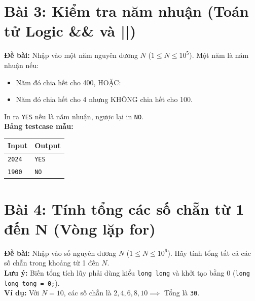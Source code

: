 \documentclass[11pt,a4paper]{article}
\begin{document}
\section*{\color{AsianDarkBlue}Bài 3: Kiểm tra năm nhuận (Toán tử Logic \&\& và ||)}
\textbf{Đề bài:} Nhập vào một năm nguyên dương $N$ ($1 \le N \le 10^5$). Một năm là năm nhuận nếu:
\begin{itemize}
    \setlength{\itemsep}{1pt}
    \item Năm đó chia hết cho 400, HOẶC:
    \item Năm đó chia hết cho 4 nhưng KHÔNG chia hết cho 100.
\end{itemize}
In ra \texttt{YES} nếu là năm nhuận, ngược lại in \texttt{NO}.\\
\textbf{Bảng testcase mẫu:}
\begin{table}[h!]
\centering\small
\begin{tabular}{|p{7.5cm}|p{7.5cm}|}
\hline
\textbf{Input} & \textbf{Output} \\ \hline
\texttt{2024} & \texttt{YES} \\ \hline
\texttt{1900} & \texttt{NO} \\ \hline
\end{tabular}
\end{table}

\section*{\color{AsianDarkBlue}Bài 4: Tính tổng các số chẵn từ 1 đến N (Vòng lặp for)}
\textbf{Đề bài:} Nhập vào số nguyên dương $N$ ($1 \le N \le 10^6$). Hãy tính tổng tất cả các số chẵn trong khoảng từ 1 đến $N$.\\
\textbf{Lưu ý:} Biến tổng tích lũy phải dùng kiểu \texttt{long long} và khởi tạo bằng 0 (\texttt{long long tong = 0;}).\\
\textbf{Ví dụ:} Với $N = 10$, các số chẵn là $2, 4, 6, 8, 10 \implies$ Tổng là \texttt{30}.
\end{document}
